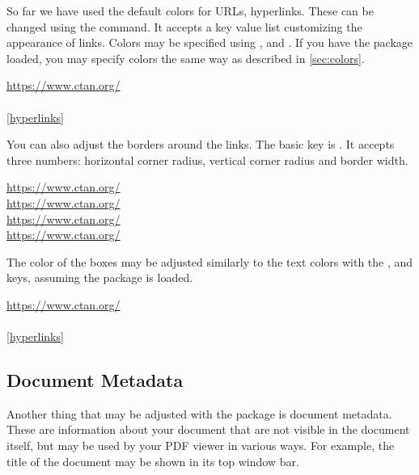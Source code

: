 So far we have used the default colors for URLs, hyperlinks. These can be
changed using the  command. It accepts a key value list
customizing the appearance of links. Colors may be specified using
,  and . If you have the
 package loaded, you may specify colors the same way as described
in \autoref{sec:colors}.
\begin{chktexignore}
\begin{example}
\hypersetup{
  urlcolor = pink,
  citecolor = purple,
  linkcolor = teal!50!yellow,
}
\url{https://www.ctan.org/} \\
\cite{pack:hyperref} \\
\autoref{hyperlinks}
\end{example}
\end{chktexignore}

You can also adjust the borders around the links. The basic key is
. It accepts three numbers: horizontal corner radius, vertical
corner radius and border width.
\begin{example}
\hypersetup{pdfborder = 0 0 1}
\url{https://www.ctan.org/} \\
\hypersetup{pdfborder = 10 10 3}
\url{https://www.ctan.org/} \\
\hypersetup{pdfborder = 10 5 2}
\url{https://www.ctan.org/} \\
\hypersetup{pdfborder = 2 7 5}
\url{https://www.ctan.org/}
\end{example}
The color of the boxes may be adjusted similarly to the text colors with the
,  and 
keys, assuming the  package is loaded.
\begin{chktexignore}
  \begin{example}
\hypersetup{
  pdfborder = 0 0 2,
  urlbordercolor = violet,
  citebordercolor = pink,
  linkbordercolor = teal,
}
\url{https://www.ctan.org/} \\
\cite{pack:hyperref} \\
\autoref{hyperlinks}
\end{example}
\end{chktexignore}

\subsection{Document Metadata}\label{sec:pdfmeta}

Another thing that may be adjusted with the  package is document
metadata. These are information about your document that are not visible in the
document itself, but may be used by your PDF viewer in various ways. For
example, the title of the document may be shown in its top window bar.

